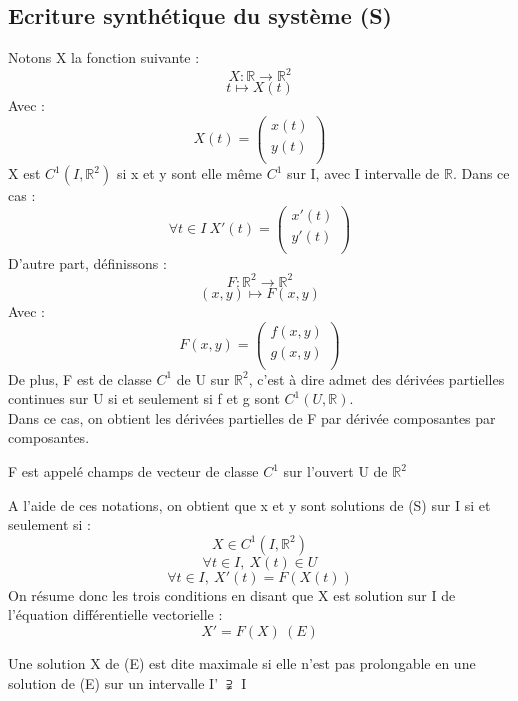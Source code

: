 \subsection{Ecriture synthétique du système (S)}
Notons X la fonction suivante :
$$X : \mathbb{R} \rightarrow \mathbb{R}^2$$
$$t \mapsto X(t)$$
Avec : 
$$X(t) = \begin{pmatrix}
  x(t) \\
  y(t) \\
\end{pmatrix}
$$
X est $C^{1}(I,\mathbb{R}^2)$ si x et y sont elle même $C^1$ sur I, avec I intervalle de $\mathbb{R}$. Dans ce cas : 
$$\forall t \in I~ X'(t) = \begin{pmatrix}
  x'(t) \\
  y'(t) \\
\end{pmatrix}$$
D'autre part, définissons : 
$$F : \mathbb{R}^2 \rightarrow \mathbb{R}^2$$
$$(x,y) \mapsto F(x,y)$$
Avec : 
$$F(x,y) = \begin{pmatrix}
  f(x,y) \\
  g(x,y) \\
\end{pmatrix}
$$
De plus, F est de classe $C^1$ de U sur $\mathbb{R}^2$, c'est à dire admet des dérivées partielles continues sur U si et seulement si f et g sont $C^{1}(U,\mathbb{R})$.\\
Dans ce cas, on obtient les dérivées partielles de F par dérivée composantes par composantes.
\begin{de}
F est appelé champs de vecteur de classe $C^1$ sur l'ouvert U de $\mathbb{R}^2$
\end{de}
A l'aide de ces notations, on obtient que x et y sont solutions de (S) sur I si et seulement si : 
$$X \in C^{1}(I,\mathbb{R}^2)$$
$$\forall t \in I,~ X(t) \in U$$
$$\forall t \in I,~ X'(t) = F(X(t))$$
On résume donc les trois conditions en disant que X est solution sur I de l'équation différentielle vectorielle : 
$$X' = F(X)~ (E)$$
\begin{de}
Une solution X de (E) est dite maximale si elle n'est pas prolongable en une solution de (E) sur un intervalle I' $\supsetneqq$ I
\end{de}
